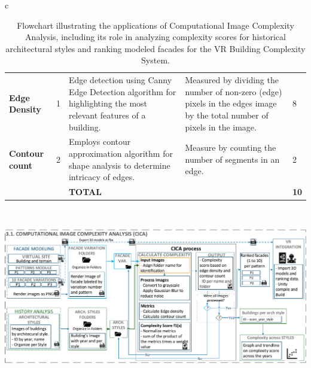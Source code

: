 \documentclass[final,5p,times]{elsarticle}
\begin{document}
\begin{table}[htb]
\begin{tabular}{c}
\begin{minipage}{\textwidth}
\begin{tabularx}{\textwidth}{p{3.5cm} p{1cm} X X p{1cm}}
                        \textbf{Edge Density} &
                          1 &
                          Edge detection using Canny Edge Detection algorithm for highlighting the most relevant features of a building.
                            &
                          Measured by dividing the number of non-zero (edge) pixels in the edges image by the total number of pixels in the image.
                            &
                          8\\
                        \textbf{Contour count} &
                          2 &
                          Employs contour approximation algorithm for shape analysis to determine intricacy of edges.
                            &
                          Measure by counting the number of segments in an edge.
                            &
                          2\\ \bottomrule
                           &
                           &
                          \textbf{TOTAL} &
                          &
                          \textbf{10}\\ \bottomrule
                    \end{tabularx}
                \end{minipage}
                \\
                \begin{minipage}{\textwidth}
                    \centering
                    \includegraphics[width= \linewidth]{Images/ImageComplexityAnalysisFlowchart}
                    \caption{Flowchart illustrating the applications of Computational Image Complexity Analysis, including its role in analyzing complexity scores for historical architectural styles and ranking modeled facades for the VR Building Complexity System.}
                  \label{fig:ImageComplexityAnalysisFlowchart}
                \end{minipage}
            \end{tabular}
        \end{table}
\end{document}
